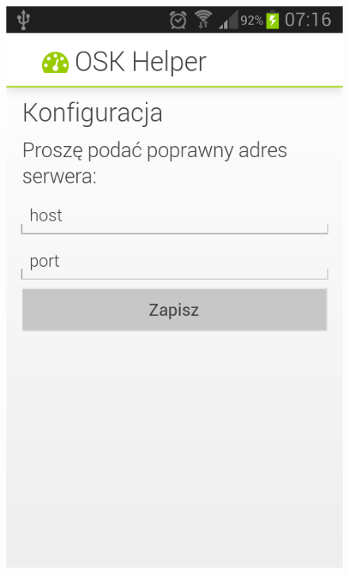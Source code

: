 \documentclass[twoside,a4paper,openright,12pt]{book}
\begin{document}
\begin{figure}[H]
\centering
\begin{minipage}{.48\textwidth}
  \centering
  \includegraphics[width=1\linewidth]{screenshots/android/konfiguracja_serwera.png}
  \label{fig:ekran_poczatkowy1}
\end{minipage}%
\begin{minipage}{.04\textwidth}
   ~
\end{minipage}%
\begin{minipage}{.48\textwidth}
  \centering

\end{minipage}
\end{figure}
\end{document}
